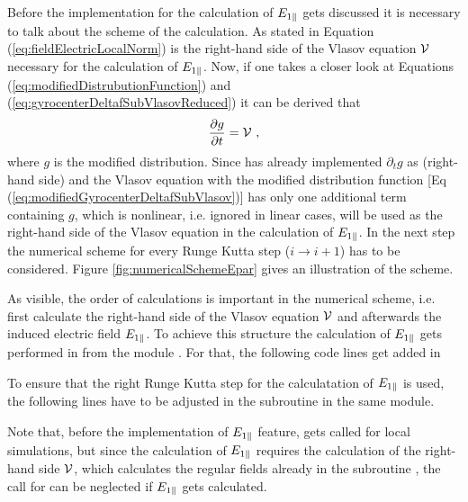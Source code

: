 Before the implementation for the calculation of $E_{1\parallel}$ gets discussed it is necessary to talk about the scheme of the calculation. As stated in Equation (\ref{eq:fieldElectricLocalNorm}) is the right-hand side of the Vlasov equation $\mathcal{V}$ necessary for the calculation of $E_{1\parallel}$. Now, if one takes a closer look at Equations (\ref{eq:modifiedDistrubutionFunction}) and (\ref{eq:gyrocenterDeltafSubVlasovReduced}) it can be derived that
\begin{gather}
    \frac{\partial g}{\partial t} = \mathcal{V}~,
    \label{eq:rightHandSide}
\end{gather}
where $g$ is the modified distribution. Since \gkw has already implemented $\partial_t g$ as  (right-hand side) and the Vlasov equation with the modified distribution function [Eq (\ref{eq:modifiedGyrocenterDeltafSubVlasov})] has only one additional term containing $g$, which is nonlinear, i.e. ignored in linear cases,  will be used as the right-hand side of the Vlasov equation in the calculation of $E_{1\parallel}$. In the next step the numerical scheme for every Runge Kutta step ($i \rightarrow i+1$) has to be considered. Figure \ref{fig:numericalSchemeEpar} gives an illustration of the scheme.


As visible, the order of calculations is important in the numerical scheme, i.e. first calculate the right-hand side of the Vlasov equation $\mathcal{V}$ and afterwards the induced electric field $E_{1\parallel}$. To achieve this structure the calculation of $E_{1\parallel}$ gets performed in  from the module . For that, the following code lines get added in 



To ensure that the right Runge Kutta step for the calculatation of $E_{1\parallel}$ is used, the following lines have to be adjusted in the subroutine  in the same module.



Note that, before the implementation of $E_{1\parallel}$ feature,  gets called for local simulations, but since the calculation of $E_{1\parallel}$ requires the calculation of the right-hand side $\mathcal{V}$, which calculates the regular fields already in the subroutine , the call for  can be neglected if $E_{1\parallel}$ gets calculated.

